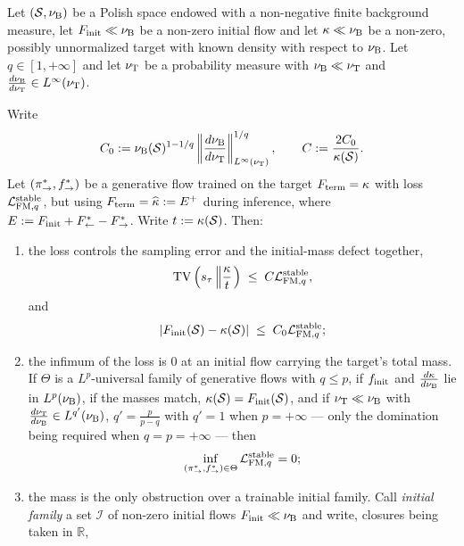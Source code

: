 \begin{theorem}
\label{theo:RL_CV_bound_full} Let $(\mathcal S,\nu_{\mathrm{B}})$ be a Polish space endowed with a non-negative finite background measure, let $F_{\mathrm{init}}\ll\nu_{\mathrm{B}}$ be a non-zero initial flow and let $\kappa\ll \nu_{\mathrm{B}}$ be a non-zero, possibly unnormalized target with known density with respect to $\nu_{\mathrm{B}}$. Let $q\in[1,+\infty]$ and let $\nu_{\mathrm{T}}$ be a probability measure with $\nu_{\mathrm{B}} \ll \nu_{\mathrm{T}}$ and $\frac{d\nu_{\mathrm{B}}}{d\nu_{\mathrm{T}}}\in L^\infty(\nu_{\mathrm{T}})$.

Write
\begin{equation}\label{equ:stable_constants}
    C_0:=\nu_{\mathrm{B}}(\mathcal S)^{1-1/q}\left\|\frac{d\nu_{\mathrm{B}}}{d\nu_{\mathrm{T}}}\right\|^{1/q}_{L^\infty(\nu_{\mathrm{T}})},
    \qquad
    C:=\frac{2C_0}{\kappa(\mathcal S)} .
\end{equation}
Let $(\pi_{\rightarrow}^*,f^*_{\rightarrow})$ be a generative flow trained on the target $F_{\mathrm{term}}=\kappa$ with loss $\mathcal L_{\mathrm{FM},q}^{\mathrm{stable}}$, but using $F_{\mathrm{term}}=\widehat{\kappa} := E^+$ during inference, where $E:=F_{\mathrm{init}}+F^*_{\leftarrow}-F^*_{\rightarrow}$. Write $t:=\kappa(\mathcal S)$. Then:
\begin{enumerate}
    \item the loss controls the sampling error and the initial-mass defect together,
    \begin{equation}\label{equ:stable_bound}
      \mathrm{TV}\left(s_\tau \left\| \frac{\kappa}{t} \right.\right)\;\leq\;C\mathcal L_{\mathrm{FM},q}^{\mathrm{stable}} ,
    \end{equation}
    and
\begin{equation}\label{equ:mass_floor}
    \left|F_{\mathrm{init}}(\mathcal S)-\kappa(\mathcal S)\right|\;\leq\;C_0\mathcal L_{\mathrm{FM},q}^{\mathrm{stable}} ;
\end{equation}
    \item the infimum of the loss is $0$ at an initial flow carrying the target's total mass. If $\Theta$ is a $L^p$-universal family of generative flows with $q\leq p$, if $f_{\mathrm{init}}$ and $\frac{d\kappa}{d\nu_{\mathrm{B}}}$ lie in $L^p(\nu_{\mathrm{B}})$, if the masses match, $\kappa(\mathcal S)=F_{\mathrm{init}}(\mathcal S)$, and if $\nu_{\mathrm{T}}\ll\nu_{\mathrm{B}}$ with $\frac{d\nu_{\mathrm{T}}}{d\nu_{\mathrm{B}}}\in L^{q'}(\nu_{\mathrm{B}})$, $q'=\frac{p}{p-q}$ with $q'=1$ when $p=+\infty$ --- only the domination being required when $q=p=+\infty$ --- then
\begin{equation}
    \inf_{(\pi_{\rightarrow}^*,f^*_{\rightarrow})\in \Theta} \mathcal L_{\mathrm{FM},q}^{\mathrm{stable}} = 0 ;
\end{equation}
    \item the mass is the only obstruction over a trainable initial family. Call \emph{initial family} a set $\mathcal I$ of non-zero initial flows $F_{\mathrm{init}}\ll\nu_{\mathrm{B}}$ and write, closures being taken in $\mathbb R$,

\end{enumerate}
\end{theorem}
